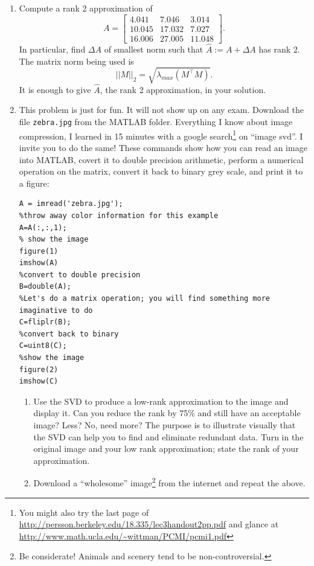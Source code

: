 \documentclass[letterpaper]{article}
\begin{document}
\begin{enumerate}
\item Compute a rank 2 approximation of $$A=\left[ \begin{array}{rrr}4.041& 7.046& 3.014\\10.045& 17.032& 7.027\\16.006& 27.005& 11.048\end{array} \right].$$
    In particular, find $\Delta A$ of smallest norm such that $\widehat{A}:=A+\Delta A$ has rank 2. The matrix norm being used is
    $$||M||_2 = \sqrt{\lambda_{max}(M^\top M)}.$$ It is enough to give $\widehat{A}$, the rank 2 approximation, in your solution.


\item This problem is just for fun. It will not show up on any exam. Download the file \texttt{zebra.jpg} from the MATLAB folder. Everything I know about image compression, I learned in 15 minutes with a google search\footnote{You might also try the last page of \url{http://persson.berkeley.edu/18.335/lec3handout2pp.pdf} and glance at \newline \url{http://www.math.ucla.edu/~wittman/PCMI/pcmi1.pdf}} on ``image svd''. I invite you to do the same! These commands show how you can read an image into MATLAB, covert it to double precision arithmetic, perform a numerical operation on the matrix, convert it back to binary grey scale, and print it to a figure:
    \begin{verbatim}
A = imread('zebra.jpg');
%throw away color information for this example
A=A(:,:,1);
% show the image
figure(1)
imshow(A)
%convert to double precision
B=double(A);
%Let's do a matrix operation; you will find something more imaginative to do
C=fliplr(B);
%convert back to binary
C=uint8(C);
%show the image
figure(2)
imshow(C)
    \end{verbatim}
         \begin{enumerate}
\setlength{\itemsep}{.1in}
\renewcommand{\labelenumi}{(\alph{enumi})}
\item Use the SVD to produce a low-rank approximation to the image and display it. Can you reduce the rank by 75\% and still have an acceptable image? Less? No, need more? The purpose is to illustrate visually that the SVD can help you to find and eliminate redundant data. Turn in the original image and your low rank approximation; state the rank of your approximation.

\item  Download a ``wholesome'' image\footnote{Be considerate! Animals and scenery tend to be non-controversial.} from the internet and repeat the above.


\end{enumerate}
\end{enumerate}
\end{document}
